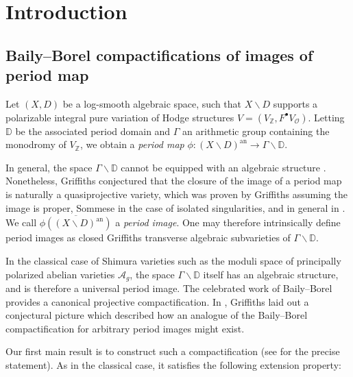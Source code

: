 \documentclass{amsart}
\newcommand{\bs}{\backslash}
\newcommand{\an}{\operatorname{an}}
\newcommand{\ol}{\overline}
\theoremstyle{definition}
\theoremstyle{remark}
\def\bD{\mathbb{D}}
\def\bZ{\mathbb{Z}}
\def\cA{\mathcal{A}}
\def\cO{\mathcal{O}}
\def\an{\mathrm{an}}
\numberwithin{equation}{section}
\begin{document}
\setcounter{tocdepth}{1}

\tableofcontents





\section{Introduction}


\subsection{Baily--Borel compactifications of images of period map}

Let $(X,D)$ be a log-smooth algebraic space, such that $X\bs D$ supports a polarizable integral pure variation of Hodge structures $V=(V_{\bZ},F^{\bullet}V_\cO)$. Letting $\bD$ be the associated period domain and $\Gamma$ an arithmetic group containing the monodromy of $V_{\bZ}$, we obtain a \textit{period map} $\phi:(X\bs D)^{\an}\to \Gamma\bs\bD.$ 

In general, the space $\Gamma\bs\bD$ cannot be equipped with an algebraic structure \cite{GRT13}. Nonetheless, Griffiths conjectured \cite[p.259]{G70Summary} that the closure of the image of a period
map is naturally a quasiprojective variety, which was proven by Griffiths assuming the image is proper, Sommese \cite{Som75} in the case of isolated singularities, and in general in \cite[Theorem 1.1]{BBT23}. We call $\ol{\phi((X\bs D)^\an)}$ a \emph{period image}. One may therefore intrinsically define period images as closed Griffiths transverse algebraic subvarieties of $\Gamma\bs\bD$.

In the classical case of Shimura varieties such as the moduli space of principally polarized abelian varieties $\cA_g$, the space $\Gamma\bs\bD$ itself has an algebraic structure, and is therefore a universal period image. The celebrated work of Baily--Borel \cite{BB66} provides a canonical projective compactification.  In \cite[\S9,10]{G70Summary}, Griffiths laid out a conjectural picture which described how an analogue of the Baily--Borel compactification for arbitrary period images might exist.


Our first main result is to construct such a compactification (see  for the precise statement).  As in the classical case, it satisfies the following extension property:
\end{document}
